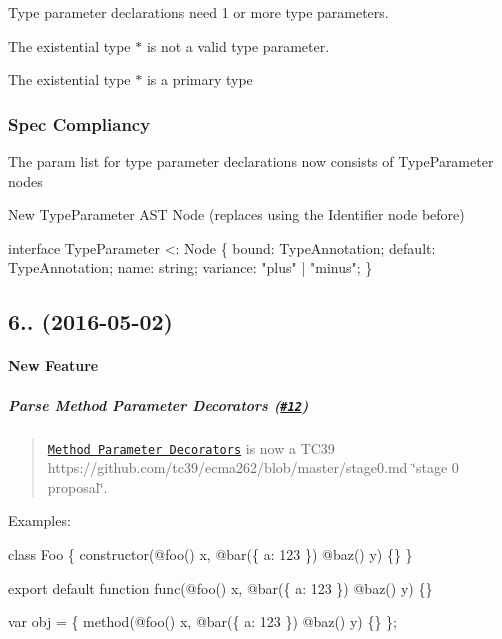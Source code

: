 \begin{DoxyItemize}
\item Type parameter declarations need 1 or more type parameters.
\item The existential type {\ttfamily $\ast$} is not a valid type parameter.
\item The existential type {\ttfamily $\ast$} is a primary type
\end{DoxyItemize}

\subsubsection*{Spec Compliancy}


\begin{DoxyItemize}
\item The param list for type parameter declarations now consists of {\ttfamily Type\+Parameter} nodes
\item New {\ttfamily Type\+Parameter} A\+ST Node (replaces using the {\ttfamily Identifier} node before)
\end{DoxyItemize}


\begin{DoxyCode}
interface TypeParameter <: Node \{
  bound: TypeAnnotation;
  default: TypeAnnotation;
  name: string;
  variance: "plus" | "minus";
\}
\end{DoxyCode}


\subsection*{6.. (2016-\/05-\/02)}

\paragraph*{New Feature}

\subparagraph*{Parse Method Parameter Decorators (\href{https://github.com/babel/babylon/pull/12}{\tt \#12})}

\begin{quote}
\href{https://goo.gl/8MmCMG}{\tt Method Parameter Decorators} is now a T\+C39 https\+://github.com/tc39/ecma262/blob/master/stage0.\+md \char`\"{}stage 0 proposal\char`\"{}. \end{quote}


Examples\+:


\begin{DoxyCode}
class Foo \{
  constructor(@foo() x, @bar(\{ a: 123 \}) @baz() y) \{\}
\}

export default function func(@foo() x, @bar(\{ a: 123 \}) @baz() y) \{\}

var obj = \{
  method(@foo() x, @bar(\{ a: 123 \}) @baz() y) \{\}
\};
\end{DoxyCode}


